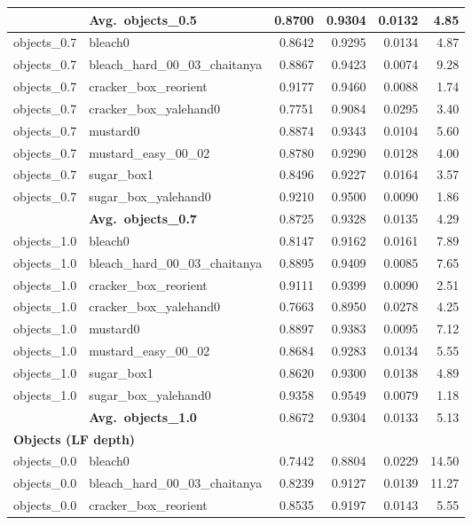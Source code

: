 \begin{longtable}{llrrrr}
  & \textbf{Avg.~objects_0.5} & 0.8700 & 0.9304 & 0.0132 & 4.85 \\
  \midrule
  objects_0.7 & bleach0 & 0.8642 & 0.9295 & 0.0134 & 4.87 \\
  objects_0.7 & bleach\_hard\_00\_03\_chaitanya & 0.8867 & 0.9423 & 0.0074 & 9.28 \\
  objects_0.7 & cracker\_box\_reorient & 0.9177 & 0.9460 & 0.0088 & 1.74 \\
  objects_0.7 & cracker\_box\_yalehand0 & 0.7751 & 0.9084 & 0.0295 & 3.40 \\
  objects_0.7 & mustard0 & 0.8874 & 0.9343 & 0.0104 & 5.60 \\
  objects_0.7 & mustard\_easy\_00\_02 & 0.8780 & 0.9290 & 0.0128 & 4.00 \\
  objects_0.7 & sugar\_box1 & 0.8496 & 0.9227 & 0.0164 & 3.57 \\
  objects_0.7 & sugar\_box\_yalehand0 & 0.9210 & 0.9500 & 0.0090 & 1.86 \\
  \cmidrule{2-6}
  & \textbf{Avg.~objects_0.7} & 0.8725 & 0.9328 & 0.0135 & 4.29 \\
  \midrule
  objects_1.0 & bleach0 & 0.8147 & 0.9162 & 0.0161 & 7.89 \\
  objects_1.0 & bleach\_hard\_00\_03\_chaitanya & 0.8895 & 0.9409 & 0.0085 & 7.65 \\
  objects_1.0 & cracker\_box\_reorient & 0.9111 & 0.9399 & 0.0090 & 2.51 \\
  objects_1.0 & cracker\_box\_yalehand0 & 0.7663 & 0.8950 & 0.0278 & 4.25 \\
  objects_1.0 & mustard0 & 0.8897 & 0.9383 & 0.0095 & 7.12 \\
  objects_1.0 & mustard\_easy\_00\_02 & 0.8684 & 0.9283 & 0.0134 & 5.55 \\
  objects_1.0 & sugar\_box1 & 0.8620 & 0.9300 & 0.0138 & 4.89 \\
  objects_1.0 & sugar\_box\_yalehand0 & 0.9358 & 0.9549 & 0.0079 & 1.18 \\
  \cmidrule{2-6}
  & \textbf{Avg.~objects_1.0} & 0.8672 & 0.9304 & 0.0133 & 5.13 \\
  \midrule
\multicolumn{6}{l}{\textbf{Objects (LF depth)}} \\
\midrule
  objects_0.0 & bleach0 & 0.7442 & 0.8804 & 0.0229 & 14.50 \\
  objects_0.0 & bleach\_hard\_00\_03\_chaitanya & 0.8239 & 0.9127 & 0.0139 & 11.27 \\
  objects_0.0 & cracker\_box\_reorient & 0.8535 & 0.9197 & 0.0143 & 5.55 \\

\end{longtable}
